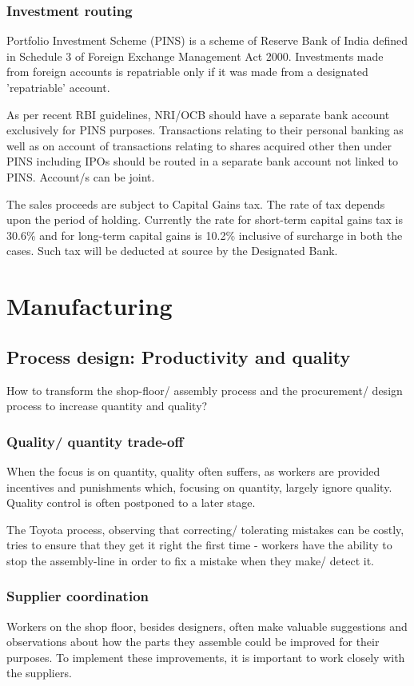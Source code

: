 \documentclass[oneside, article]{memoir}
\begin{document}
\subsection{Investment routing}
Portfolio Investment Scheme (PINS) is a scheme of Reserve Bank of India defined in Schedule 3 of Foreign Exchange Management Act 2000. Investments made from foreign accounts is repatriable only if it was made from a designated 'repatriable' account.

\subitem As per recent RBI guidelines, NRI/OCB should have a separate bank account exclusively for PINS purposes. Transactions relating to their personal banking as well as on account of transactions relating to shares acquired other then under PINS including IPOs should be routed in a separate bank account not linked to PINS. Account/s can be joint.

\subitem The sales proceeds are subject to Capital Gains tax. The rate of tax depends upon the period of holding. Currently the rate for short-term capital gains tax is 30.6\% and for long-term capital gains is 10.2\% inclusive of surcharge in both the cases. Such tax will be deducted at source by the Designated Bank.

\chapter{Manufacturing}
\section{Process design: Productivity and quality}
How to transform the shop-floor/ assembly process and the procurement/ design process to increase quantity and quality?

\subsection{Quality/ quantity trade-off}
When the focus is on quantity, quality often suffers, as workers are provided incentives and punishments which, focusing on quantity, largely ignore quality. Quality control is often postponed to a later stage.

The Toyota process, observing that correcting/ tolerating mistakes can be costly, tries to ensure that they get it right the first time - workers have the ability to stop the assembly-line in order to fix a mistake when they make/ detect it.

\subsection{Supplier coordination}
Workers on the shop floor, besides designers, often make valuable suggestions and observations about how the parts they assemble could be improved for their purposes. To implement these improvements, it is important to work closely with the suppliers.
\end{document}
